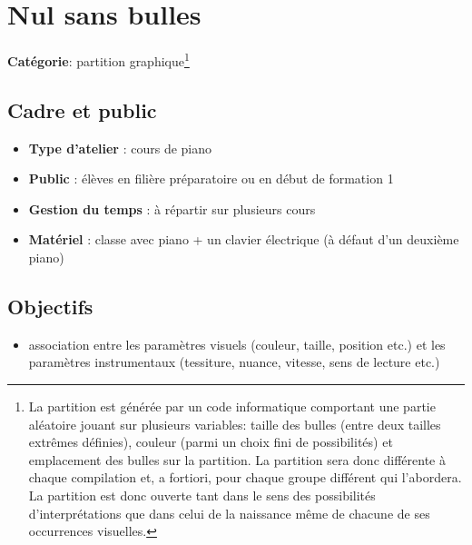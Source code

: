 \documentclass[a4paper,11pt,bibliography=totoc,numbers=noenddot,listof=flat,DIV=11,BCOR=0mm]{scrreprt}%
\begin{document}
\chapter[Partition graphique: Nul sans bulles]{Nul sans bulles}

{\large \textbf{Catégorie}}:
 partition graphique\footnote{La partition est générée par un code informatique comportant une partie aléatoire jouant sur plusieurs variables: taille des bulles (entre deux tailles extrêmes définies), couleur (parmi un choix fini de possibilités) et emplacement des bulles sur la partition. La partition sera donc différente à chaque compilation et, a fortiori, pour chaque groupe différent qui l'abordera. La partition est donc ouverte tant dans le sens des possibilités d'interprétations que dans celui de la naissance même de chacune de ses occurrences visuelles.}


\section*{Cadre et public}
\begin{itemize}
\item [\textbullet]\textbf{Type d'atelier} : cours de piano

\item [\textbullet]\textbf{Public} : élèves en filière préparatoire ou en début de formation 1

\item [\textbullet]\textbf{Gestion du temps} : à répartir sur plusieurs cours

\item [\textbullet]\textbf{Matériel} : classe avec piano + un clavier électrique (à défaut d'un deuxième piano)
\end{itemize}

\section*{Objectifs}
\begin{itemize}
\item association entre les paramètres visuels (couleur, taille, position etc.) et les paramètres instrumentaux (tessiture, nuance, vitesse, sens de lecture etc.)
\end{itemize}
\end{document}

